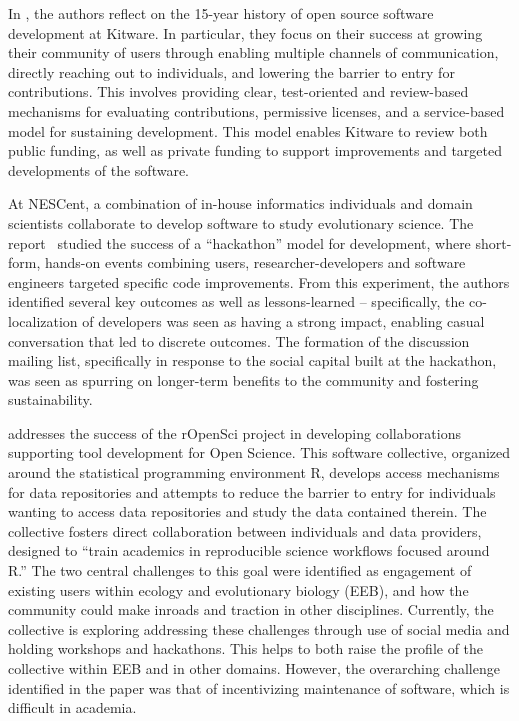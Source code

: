 \documentclass[11pt, oneside]{amsart}
\begin{document}
In \cite{Hanwell_WSSSPE}, the authors reflect on the 15-year history of open
source software development at Kitware.  In particular, they focus on their
success at growing their community of users through enabling multiple channels
of communication, directly reaching out to individuals, and lowering the
barrier to entry for contributions. This involves providing clear,
test-oriented and review-based mechanisms for evaluating contributions,
permissive licenses, and a service-based model for sustaining development.
This model enables Kitware to review both public funding, as well as private
funding to support improvements and targeted developments of the software.

At NESCent, a combination of in-house informatics individuals and domain
scientists collaborate to develop software to study evolutionary science.  The
report~\cite{Cranston_WSSSPE} studied the success of a ``hackathon'' model
for development, where short-form, hands-on events combining users,
researcher-developers and software engineers targeted specific code
improvements. From this experiment, the authors identified several key
outcomes as well as lessons-learned -- specifically, the co-localization of
developers was seen as having a strong impact, enabling casual conversation
that led to discrete outcomes.  The formation of the discussion mailing list,
specifically in response to the social capital built at the hackathon, was seen
as spurring on longer-term benefits to the community and fostering
sustainability.

\cite{Hart_WSSSPE} addresses the success of the rOpenSci project in developing
collaborations supporting tool development for Open Science.  This software
collective, organized around the statistical programming environment R,
develops access mechanisms for data repositories and attempts to reduce the
barrier to entry for individuals wanting to access data repositories and study
the data contained therein.  The collective fosters direct collaboration
between individuals and data providers, designed to ``train academics in
reproducible science workflows focused around R.''  The two central challenges
to this goal were identified as engagement of existing users within ecology and
evolutionary biology (EEB), and how the community could make inroads and traction
in other disciplines. Currently, the collective is exploring addressing these
challenges through use of social media and holding workshops and hackathons.
This helps to both raise the profile of the collective within EEB and in other
domains.  However, the overarching challenge identified in the paper was that
of incentivizing maintenance of software, which is difficult in academia.
\end{document}
